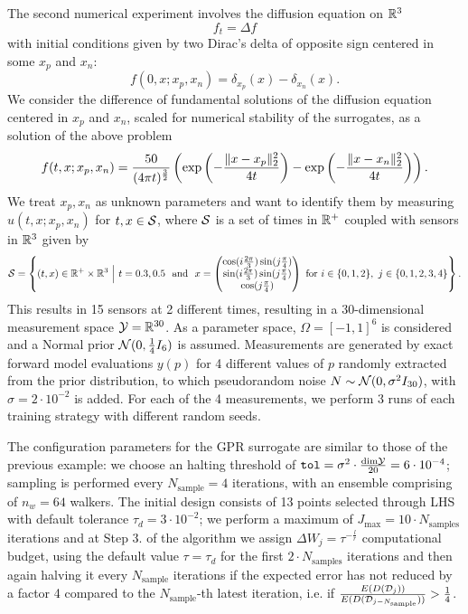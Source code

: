 The second numerical experiment involves the diffusion equation on $\mathbb{R}^3$
\[
f_t = \Delta f
\]
with initial conditions given by two Dirac's delta of opposite sign centered in some $x_p$ and $x_n$:
\[
f (0,x; x_p, x_n) = \delta_{x_p}(x) - \delta_{x_n}(x).
\]
We consider the difference of fundamental solutions of the diffusion equation centered in $x_p$ and $x_n$, scaled for numerical stability of the surrogates, as a solution of the above problem
\begin{equation}\label{eq:diffusion-solution}
f(t,x; x_p, x_n) = \frac{50}{(4 \pi t)^{\frac{3}{2}}} \left( \exp \left( - \frac{\lVert x-x_p\rVert_2^2}{4t}\right)- \exp \left( - \frac{\lVert x-x_n\rVert_2^2}{4t}\right) \right).
\end{equation}
We treat $x_p, x_n$ as unknown parameters and want to identify them by measuring $u(t,x;x_p, x_n)$ for $t,x \in \mathcal S$, where $\mathcal S$ is a set of times in $\mathbb{R}^+$ coupled with sensors in $\mathbb{R}^3$ given by
\[
\mc S  = \left\{ (t,x) \in \R^+ \times \R^3 \ \Big| \ t = 0.3, 0.5 \ \text{ and } \ x = \begin{pmatrix}
            \cos( i \frac{2\pi}{3}) \sin( j \frac{\pi}{4}) \\
            \sin( i \frac{2\pi}{3}) \sin( j \frac{\pi}{4}) \\ 
            \cos( j \frac{\pi}{4})
        \end{pmatrix} 
         \text{ for } i \in \{0,1,2\}, \ j \in \{0,1,2,3,4\}
        \right\}.         
\]
This results in 15 sensors at 2 different times, resulting in a 30-dimensional measurement space $\mathcal Y = \mathbb{R}^{30}$. \newline
As a parameter space, $\Omega = [-1,1]^6$ is considered and a Normal prior $\mathcal N (0, \frac{1}{4}I_6)$ is assumed.
Measurements are generated by exact forward model evaluations $y(p)$ for 4 different values of $p$ randomly extracted from the prior distribution, to which pseudorandom noise $N \sim \mathcal N (0, \sigma^2 I_{30})$, with $\sigma = 2 \cdot 10^{-2}$ is added.
For each of the 4 measurements, we perform 3 runs of each training strategy with different random seeds. \medskip

The configuration parameters for the GPR surrogate are similar to those of the previous example: we choose an halting threshold of $\texttt{tol} = \sigma^2 \cdot \frac{\text{dim} \mathcal Y }{20} = 6\cdot 10^{-4}$; sampling is performed every $N_{\text{sample}} = 4$ iterations, with an ensemble comprising of $n_w = 64$ walkers.
The initial design consists of 13 points selected through LHS with default tolerance $\tau_d = 3 \cdot 10^{-2}$; we perform a maximum of $J_{\max} = 10 \cdot N_{\text{samples}}$ iterations and at Step 3. of the algorithm we assign $\Delta W_j = \tau ^{-\frac{l}{r}}$ computational budget, using the default value $\tau= \tau_d$ for the first $2\cdot N_{\text{samples}}$ iterations and then again halving it every $N_{\text{sample}}$ iterations if the expected error has not reduced by a factor 4 compared to the $N_{\text{sample}}$-th latest iteration, i.e. if $\frac{E(D(\mathcal D_j))}{E(D(\mathcal D_{j-N_{\text{sample}}}))} > \frac{1}{4}$.

